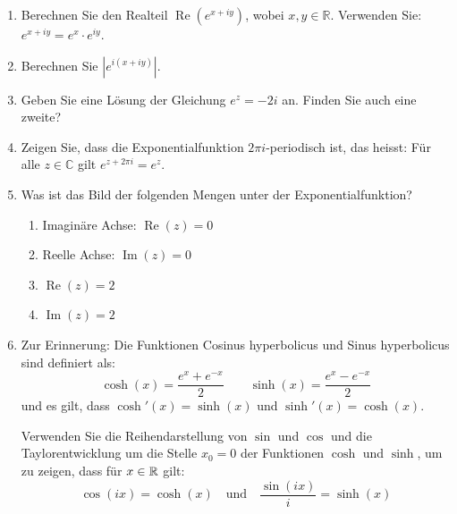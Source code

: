 \clearpage
\begin{ueb}
	{}{}
	\begin{enumerate}
		\item Berechnen Sie den Realteil $\operatorname{Re}(e^{x+iy})$, wobei $x, y \in \mathbb{R}$. Verwenden Sie: $e^{x+iy} = e^x \cdot e^{iy}$.

		\item Berechnen Sie $|e^{i(x+iy)}|$.

		\item Geben Sie eine Lösung der Gleichung $e^z = -2i$ an. Finden Sie auch eine zweite?

		\item Zeigen Sie, dass die Exponentialfunktion $2\pi i$-periodisch ist, das heisst: Für alle $z \in \mathbb{C}$ gilt $e^{z+2\pi i} = e^z$.

		\item Was ist das Bild der folgenden Mengen unter der Exponentialfunktion?
		      \begin{enumerate}
			      \item Imaginäre Achse: $\operatorname{Re}(z) = 0$
			      \item Reelle Achse: $\operatorname{Im}(z) = 0$
			      \item $\operatorname{Re}(z) = 2$
			      \item $\operatorname{Im}(z) = 2$
		      \end{enumerate}
		\item Zur Erinnerung: Die Funktionen Cosinus hyperbolicus und Sinus hyperbolicus sind definiert als:
		      $$ \cosh(x) = \frac{e^x+e^{-x}}{2} \qquad \sinh(x) = \frac{e^x-e^{-x}}{2} $$
		      und es gilt, dass $\cosh'(x) = \sinh(x)$ und $\sinh'(x) = \cosh(x)$.

		      Verwenden Sie die Reihendarstellung von $\sin$ und $\cos$ und die Taylorentwicklung um die Stelle $x_0 = 0$ der Funktionen $\cosh$ und $\sinh$, um zu zeigen, dass für $x\in\mathbb{R}$ gilt:
		      $$\cos(ix) = \cosh(x)\quad\text{und} \quad \frac{\sin(ix)}{i} = \sinh(x)$$


	\end{enumerate}
\end{ueb}

